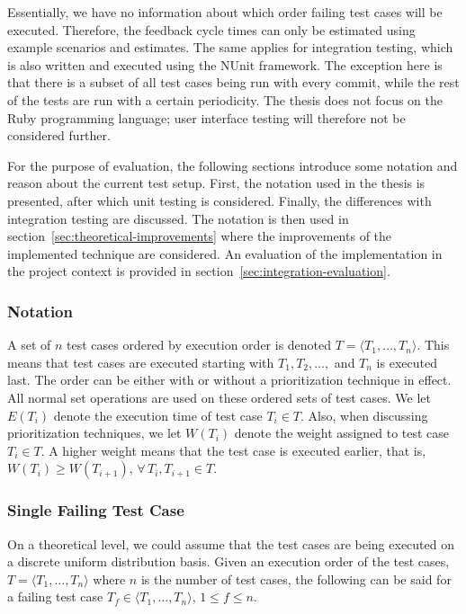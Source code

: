 \documentclass[a4paper,english,12pt]{report}
\begin{document}
Essentially, we have no information about which order failing test cases will be executed. Therefore, the feedback cycle times can only be estimated using example scenarios and estimates. The same applies for integration testing, which is also written and executed using the NUnit framework. The exception here is that there is a subset of all test cases being run with every commit, while the rest of the tests are run with a certain periodicity. The thesis does not focus on the Ruby programming language; user interface testing will therefore not be considered further.

For the purpose of evaluation, the following sections introduce some notation and reason about the current test setup. First, the notation used in the thesis is presented, after which unit testing is considered. Finally, the differences with integration testing are discussed. The notation is then used in section~\vref{sec:theoretical-improvements} where the improvements of the implemented technique are considered. An evaluation of the implementation in the project context is provided in section~\vref{sec:integration-evaluation}.

\subsubsection{Notation}
A set of $n$ test cases ordered by execution order is denoted $T = \langle T_1,\ldots,T_n \rangle$. This means that test cases are executed starting with $T_1, T_2, \ldots, $ and $T_n$ is executed last. The order can be either with or without a prioritization technique in effect. All normal set operations are used on these ordered sets of test cases. We let $E(T_i)$ denote the execution time of test case $T_i \in T$. Also, when discussing prioritization techniques, we let $W(T_i)$ denote the weight assigned to test case $T_i \in T$. A higher weight means that the test case is executed earlier, that is, $W(T_i) \geq W(T_{i+1})$, $\forall\, T_i, T_{i+1} \in T$.

\subsubsection{Single Failing Test Case}
On a theoretical level, we could assume that the test cases are being executed on a discrete uniform distribution basis. Given an execution order of the test cases, $T = \langle T_1,\ldots,T_n \rangle$ where $n$ is the number of test cases, the following can be said for a failing test case $T_f \in \langle T_1,\ldots,T_n \rangle$, $1 \leq f \leq n$.
\end{document}
